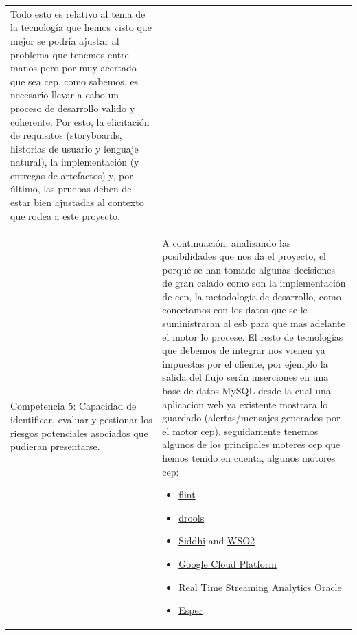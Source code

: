 \documentclass[a4paper]{article}
\begin{document}
\begin{center}
\begin{supertabular}{m{5.605cm}m{10.849cm}}
{    Todo esto es relativo al tema de la tecnología que hemos visto que mejor se podría ajustar al problema que tenemos entre manos pero por muy acertado que sea cep, como sabemos, es necesario llevar a cabo un proceso de desarrollo valido y coherente. Por esto, la elicitación de requisitos (storyboards, historias de usuario y lenguaje natural), la implementación (y entregas de artefactos) y, por último, las pruebas deben de estar bien ajustadas al contexto que rodea a este proyecto.}\\
    
    {\color{black} Competencia 5: Capacidad de identificar, evaluar y gestionar los riesgos potenciales asociados que pudieran presentarse.} &
    {\color{black} A continuación, analizando las posibilidades que nos da el proyecto, el porqué se han tomado algunas decisiones de gran calado como son la implementación de cep, la metodología de desarrollo, como conectamos con los datos que se le suministraran al esb para que mas adelante el motor lo procese. El resto de tecnologías que debemos de integrar nos vienen ya impuestas por el cliente, por ejemplo la salida del flujo serán inserciones en una base de datos MySQL desde la cual una aplicacion web ya existente mostrara lo guardado (alertas/mensajes generados por el motor cep).
     seguidamente tenemos algunos de los principales moteres cep que hemos tenido en cuenta, algunos motores cep: 
      \begin{itemize}
        \item \href{https://flink.apache.org/index.html}{flint}
        \item \href{https://docs.jboss.org/drools/release/6.2.0.CR3/drools-docs/html/DroolsComplexEventProcessingChapter.html}{drools}
        \item \href{https://github.com/wso2/siddhi
    y https://wso2.com/products/complex-event-processor/}{Siddhi} and \href{https://wso2.com/products/complex-event-processor/}{WSO2}
        \item \href{https://cloud.google.com/solutions/architecture/complex-event-processing}{Google Cloud Platform}
        \item \href{http://www.oracle.com/technetwork/middleware/complex-event-processing/documentation/index.html}{Real Time Streaming Analytics Oracle}
        \item \href{http://www.espertech.com/esper/}{Esper}
      \end{itemize}
      
}
\end{supertabular}
\end{center}
\end{document}
